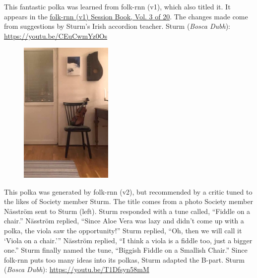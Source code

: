 \documentclass[a4paper,notitlepage,twoside]{book}
\begin{document}
{}  
  
\hypertarget{polka:WilliamMurphys}{}
This fantastic polka was learned from folk-rnn (v1), which also titled it.
It appears in the \href{https://highnoongmt.wordpress.com/2018/01/05/volumes-1-20-of-folk-rnn-v1-transcriptions}{folk-rnn (v1) Session Book, Vol. 3 of 20}.
The changes made come from suggestions by Sturm's Irish accordion teacher.
Sturm ({\em Bosca Dubh}): \url{https://youtu.be/CEuCwmYz0Os}

{}  
  
\hypertarget{polka:BiggishFiddle}{}
\begin{figure}
\includegraphics[width=0.4\textwidth]{BiggishFiddle.jpg}
\end{figure}
This polka was generated by folk-rnn (v2), but recommended by
a critic tuned to the likes of Society member Sturm.
The title comes from a photo Society member Näsström sent to Sturm (left).
Sturm responded with a tune called, ``Fiddle on a chair.''
Näsström replied, ``Since Aloe Vera was lazy and didn’t come up with a polka, 
the viola saw the opportunity!''
Sturm replied, ``Oh, then we will call it `Viola on a chair.'''
Näsström replied, ``I think a viola is a fiddle too, just a bigger one.''
Sturm finally named the tune, ``Biggish Fiddle on a Smallish Chair.''
Since folk-rnn puts too many ideas into its polkas, 
Sturm adapted the B-part.
Sturm ({\em Bosca Dubh}): \url{https://youtu.be/T1Dfsyn58mM}
\end{document}
